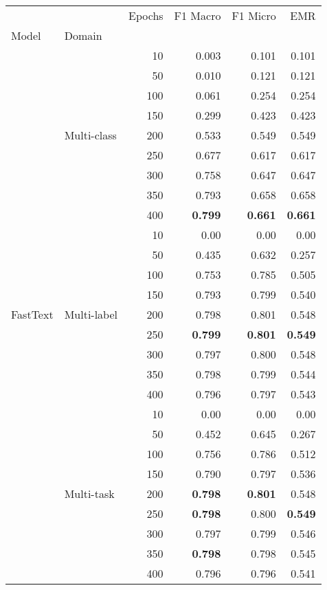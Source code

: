 \begin{tabular}{llrrrr}
\toprule
         &             &  Epochs &  F1 Macro &   F1 Micro &       EMR \\
Model & Domain &         &           &            &           \\
\midrule
\multirow{27}{*}{FastText} & \multirow{9}{*}{Multi-class} &      10 &  0.003 &   0.101 &  0.101 \\
&             &      50 &  0.010 &   0.121 &  0.121 \\
&             &     100 &  0.061 &   0.254 &  0.254 \\
&             &     150 &  0.299 &   0.423 &  0.423 \\
&             &     200 &  0.533 &   0.549 &  0.549 \\
&             &     250 &  0.677 &   0.617 &  0.617 \\
&             &     300 &  0.758 &   0.647 &  0.647 \\
&             &     350 &  0.793 &   0.658 &  0.658 \\
&             &     400 &  \bfseries 0.799 &   \bfseries 0.661& \bfseries 0.661 \\
\cmidrule(lr){2-6}
 & \multirow{9}{*}{Multi-label} &      10 &  0.00 &   0.00 &  0.00 \\
         &             &      50 &  0.435 &   0.632 &  0.257 \\
         &             &     100 &  0.753 &   0.785 &  0.505 \\
         &             &     150 &  0.793 &   0.799 &  0.540 \\
         &             &     200 &  0.798 &   0.801 &  0.548 \\
         &             &     250 &  \bfseries0.799 &   \bfseries 0.801 &  \bfseries 0.549 \\
         &             &     300 &  0.797 &   0.800 &  0.548 \\
         &             &     350 &  0.798 &   0.799 &  0.544 \\
         &             &     400 &  0.796 &   0.797 &  0.543 \\
\cmidrule(lr){2-6}
 & \multirow{9}{*}{Multi-task} & 10  & 0.00     & 0.00     & 0.00     \\
&            & 50  & 0.452 & 0.645 & 0.267 \\
&            & 100 & 0.756 & 0.786 & 0.512 \\
&            & 150 & 0.790 & 0.797 & 0.536 \\
&            & 200 & \bfseries 0.798 & \bfseries 0.801 & 0.548 \\
&            & 250 & \bfseries 0.798 & 0.800 & \bfseries 0.549 \\
&            & 300 & 0.797 & 0.799 & 0.546 \\
&            & 350 & \bfseries 0.798 & 0.798 & 0.545 \\
&            & 400 & 0.796 & 0.796 & 0.541 \\


 

\bottomrule
\end{tabular}
